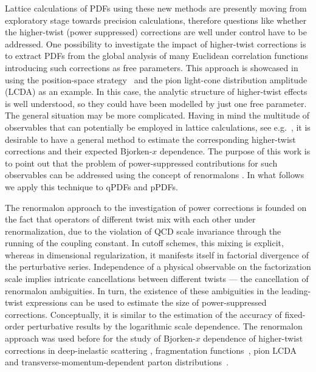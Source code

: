 Lattice calculations of PDFs using these new methods are presently moving from exploratory stage towards precision calculations, therefore questions like whether the higher-twist (power suppressed) corrections are well under control have to be addressed. One possibility to investigate the impact of higher-twist corrections is to extract PDFs from the global analysis of many Euclidean correlation functions introducing 
{such} corrections as free parameters. This approach is
showcased in \cite{Bali:2018spj} using the position-space strategy~\cite{Braun:2007wv,Bali:2017gfr} 
and the pion light-cone distribution amplitude (LCDA) as an example.
%
In this case, the analytic structure of higher-twist effects is well understood, so they could have been modelled by just one free parameter.  
The general situation  may be more complicated. Having in mind the multitude of 
observables that can potentially be employed in lattice calculations, see e.g.~\cite{Ma:2017pxb}, 
it is desirable to have a general method to estimate the corresponding higher-twist corrections and their expected Bjorken-$x$ dependence.   
The purpose of this work is to point out that the problem of power-suppressed contributions for such observables 
can be addressed using the concept of renormalons \cite{Beneke:1998ui,Beneke:2000kc}. In what follows we apply this technique 
to qPDFs and pPDFs.

The renormalon approach to the investigation of power corrections is founded on the fact that operators of different twist mix with each other under renormalization, due to the violation of QCD scale invariance through the running of the coupling constant. In cutoff schemes, this mixing is explicit, whereas in dimensional regularization, it manifests itself in factorial divergence of the perturbative series. Independence of a physical observable on the factorization scale implies intricate cancellations between different twists --- the cancellation of renormalon ambiguities. In turn, the existence of these ambiguities in the leading-twist expressions can be used to estimate the size of power-suppressed corrections. Conceptually, it is similar to the estimation of the accuracy of fixed-order perturbative results by the logarithmic scale dependence. The renormalon approach was used before for the study of Bjorken-$x$ dependence of higher-twist corrections in deep-inelastic scattering \cite{Beneke:1995pq,Dokshitzer:1995qm,Dasgupta:1996hh}, fragmentation functions~\cite{Dasgupta:1996ki,Beneke:1997sr}, pion LCDA~\cite{Braun:2004bu} and transverse-momentum-dependent parton distributions~\cite{Scimemi:2016ffw}.

